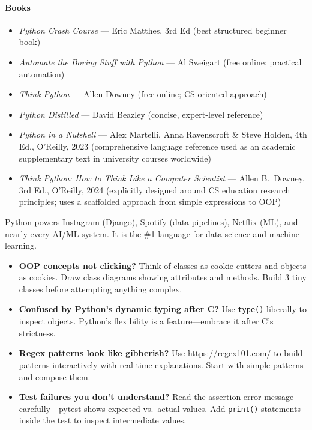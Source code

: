 \documentclass[11pt, a4paper, oneside]{report}
\begin{document}
\paragraph{Books}
\begin{itemize}[leftmargin=*]
\item \emph{Python Crash Course} --- Eric Matthes, 3rd Ed (best structured beginner book)
\item \emph{Automate the Boring Stuff with Python} --- Al Sweigart (free online; practical automation)
\item \emph{Think Python} --- Allen Downey (free online; CS-oriented approach)
\item \emph{Python Distilled} --- David Beazley (concise, expert-level reference)

\item \emph{Python in a Nutshell} --- Alex Martelli, Anna Ravenscroft \& Steve Holden, 4th Ed., O'Reilly, 2023 (comprehensive language reference used as an academic supplementary text in university courses worldwide)
\item \emph{Think Python: How to Think Like a Computer Scientist} --- Allen B.\ Downey, 3rd Ed., O'Reilly, 2024 (explicitly designed around CS education research principles; uses a scaffolded approach from simple expressions to OOP)
\end{itemize}


\begin{realworldbox}
Python powers Instagram (Django), Spotify (data pipelines), Netflix (ML), and nearly every AI/ML system. It is the \#1 language for data science and machine learning.
\end{realworldbox}


\begin{stuckbox}
\begin{itemize}[leftmargin=*]
\item \textbf{OOP concepts not clicking?} Think of classes as cookie cutters and objects as cookies. Draw class diagrams showing attributes and methods. Build 3 tiny classes before attempting anything complex.
\item \textbf{Confused by Python's dynamic typing after C?} Use \texttt{type()} liberally to inspect objects. Python's flexibility is a feature---embrace it after C's strictness.
\item \textbf{Regex patterns look like gibberish?} Use \url{https://regex101.com/} to build patterns interactively with real-time explanations. Start with simple patterns and compose them.
\item \textbf{Test failures you don't understand?} Read the assertion error message carefully---pytest shows expected vs.\ actual values. Add \texttt{print()} statements inside the test to inspect intermediate values.
\end{itemize}
\end{stuckbox}
\end{document}
